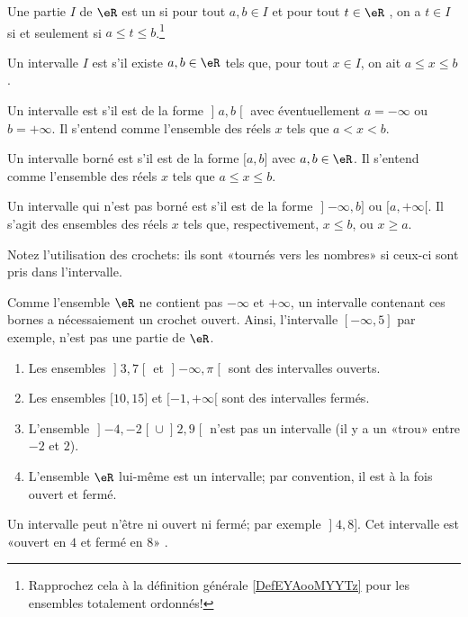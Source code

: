 \begin{definition}\label{DefIntervallesReels}
    Une partie \( I\) de \( \eR\) est un  si pour tout \( a,b\in I\) et pour tout \( t\in \eR\) , on a \( t \in I \) si et seulement si \( a\leq t\leq b\).\footnote{Rapprochez cela à la définition générale \ref{DefEYAooMYYTz} pour les ensembles totalement ordonnés!}

    Un intervalle \( I \) est  s'il existe \(a, b \in \eR \) tels que,  pour tout \( x \in I \), on ait \( a \leq x \leq b \).

    Un intervalle est  s'il est de la forme \( \mathopen] a , b \mathclose[\) avec éventuellement \( a=-\infty\) ou \( b=+\infty\). Il s'entend comme l'ensemble des réels \( x \) tels que \( a < x < b \).

    Un intervalle borné est  s'il est de la forme \( \mathopen[ a , b \mathclose]\) avec \( a,b\in \eR\). Il s'entend comme l'ensemble des réels \( x \) tels que \( a \leq x \leq b \).

    Un intervalle qui n'est pas borné est  s'il est de la forme \( \mathopen] -\infty , b \mathclose]\) ou \( \mathopen[ a , +\infty [\). Il s'agit des ensembles des réels \( x \) tels que, respectivement, \( x \leq b \), ou \( x \geq a\).
\end{definition}

\begin{remark}
  Notez l'utilisation des crochets: ils sont «tournés vers les nombres» si ceux-ci sont pris dans l'intervalle.

  Comme l'ensemble $\eR$ ne contient pas $-\infty$ et $+\infty$, un intervalle contenant ces bornes a nécessaiement un crochet ouvert. Ainsi, l'intervalle $[-\infty, 5]$ par exemple, n'est pas une partie de $\eR$.
\end{remark}

\begin{example}
    \begin{enumerate}
        \item
        Les ensembles \( \mathopen] 3 , 7 \mathclose[\) et \( \mathopen] -\infty , \pi \mathclose[\) sont des intervalles ouverts.
        \item
            Les ensembles \( \mathopen[ 10 , 15 \mathclose]\) et \( \mathopen[ -1 , +\infty [\) sont des intervalles fermés.
        \item
        L'ensemble \( \mathopen] -4 , -2 \mathclose[\cup\mathopen] 2 , 9 \mathclose[\) n'est pas un intervalle (il y a un «trou» entre \(- 2\) et \( 2\)).
        \item
            L'ensemble \( \eR\) lui-même est un intervalle; par convention, il est à la fois ouvert et fermé.
    \end{enumerate}
Un intervalle peut n'être ni ouvert ni fermé; par exemple \( \mathopen] 4 , 8 \mathclose]\). Cet intervalle est «ouvert en \( 4\) et fermé en \( 8\)» .
\end{example}


